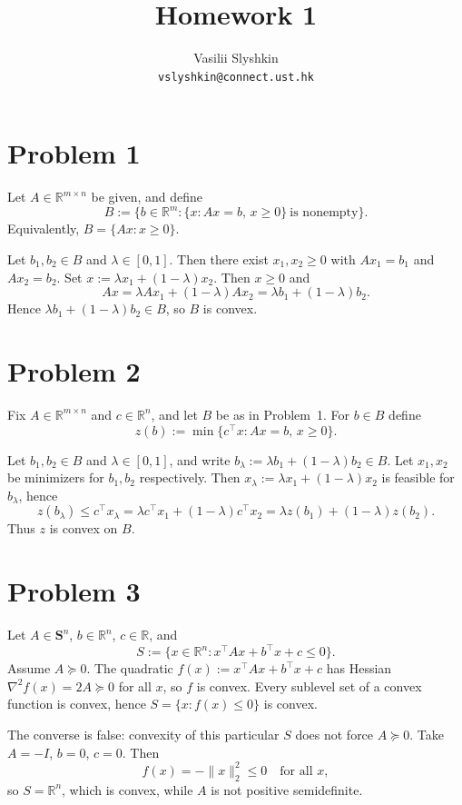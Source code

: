 \documentclass[11pt]{article}
\title{\textbf{Homework 1}}
\author{Vasilii Slyshkin \\ \texttt{vslyshkin@connect.ust.hk}}
\date{}
\begin{document}
\maketitle

\section*{Problem 1}

Let $A\in\mathbb{R}^{m\times n}$ be given, and define
\[
B := \bigl\{ b\in\mathbb{R}^m : \{x : Ax=b,\, x\ge 0\}\ \text{is nonempty}\bigr\}.
\]
Equivalently, $B=\{Ax : x\ge 0\}$.

Let $b_1,b_2\in B$ and $\lambda\in[0,1]$. Then there exist $x_1,x_2\ge 0$ with $Ax_1=b_1$ and $Ax_2=b_2$. Set $x:=\lambda x_1+(1-\lambda)x_2$. Then $x\ge 0$ and
\[
Ax = \lambda Ax_1+(1-\lambda)Ax_2 = \lambda b_1+(1-\lambda)b_2.
\]
Hence $\lambda b_1+(1-\lambda)b_2\in B$, so $B$ is convex.

\section*{Problem 2}

Fix $A\in\mathbb{R}^{m\times n}$ and $c\in\mathbb{R}^n$, and let $B$ be as in Problem~1. For $b\in B$ define
\[
z(b) := \min\bigl\{ c^\top x : Ax=b,\, x\ge 0\bigr\}.
\]

Let $b_1,b_2\in B$ and $\lambda\in[0,1]$, and write $b_\lambda:=\lambda b_1+(1-\lambda)b_2\in B$. Let $x_1,x_2$ be minimizers for $b_1,b_2$ respectively. Then $x_\lambda:=\lambda x_1+(1-\lambda)x_2$ is feasible for $b_\lambda$, hence
\[
z(b_\lambda)\le c^\top x_\lambda = \lambda c^\top x_1+(1-\lambda)c^\top x_2 = \lambda z(b_1)+(1-\lambda)z(b_2).
\]
Thus $z$ is convex on $B$.

\section*{Problem 3}

Let $A\in\mathbf{S}^n$, $b\in\mathbb{R}^n$, $c\in\mathbb{R}$, and
\[
S:=\bigl\{x\in\mathbb{R}^n : x^\top Ax + b^\top x + c\le 0\bigr\}.
\]
Assume $A\succeq 0$. The quadratic $f(x):=x^\top Ax+b^\top x+c$ has Hessian $\nabla^2 f(x)=2A\succeq 0$ for all $x$, so $f$ is convex. Every sublevel set of a convex function is convex, hence $S=\{x:f(x)\le 0\}$ is convex.

The converse is false: convexity of this particular $S$ does not force $A\succeq 0$. Take $A=-I$, $b=0$, $c=0$. Then
\[
f(x)=-\|x\|_2^2\le 0 \quad\text{for all }x,
\]
so $S=\mathbb{R}^n$, which is convex, while $A$ is not positive semidefinite.
\end{document}

